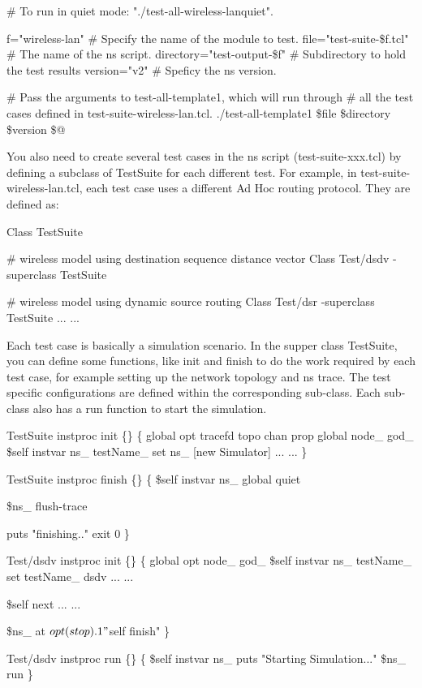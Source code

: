 \begin{program}
   \# To run in quiet mode:  "./test-all-wireless-lanquiet".

   f="wireless-lan"		\# Specify the name of the module to test.
   file="test-suite-\$f.tcl"	\# The name of the ns script.
   directory="test-output-\$f" 	\# Subdirectory to hold the test results
   version="v2"			\# Speficy the ns version.
   
   \# Pass the arguments to test-all-template1, which will run through
   \# all the test cases defined in test-suite-wireless-lan.tcl.
   ./test-all-template1 \$file \$directory \$version \$@
\end{program}


You also need to create several test cases in the ns script (test-suite-xxx.tcl)
by defining a subclass of TestSuite for each different test. For example, in 
test-suite-wireless-lan.tcl, each test case uses a different Ad Hoc routing 
protocol. They are defined as:

\begin{program}	
   Class TestSuite

   \# wireless model using destination sequence distance vector
   Class Test/dsdv -superclass TestSuite

   \# wireless model using dynamic source routing
   Class Test/dsr -superclass TestSuite
   ... ...

\end{program}


Each test case is basically a simulation scenario. In the supper class 
TestSuite, you can define some functions, like init and finish to do the work 
required by each test case, for example setting up the network topology and ns
trace. The test specific configurations are defined within the corresponding 
sub-class. Each sub-class also has a run function to start the simulation.

\begin{program}	
   TestSuite instproc init \{\} \{
     global opt tracefd topo chan prop 
     global node_ god_ 
     \$self instvar ns_ testName_
     set ns_         [new Simulator]
      ... ...
   \} 

   TestSuite instproc finish \{\} \{
     \$self instvar ns_
     global quiet

     \$ns_ flush-trace

     puts "finishing.."
     exit 0
   \}
        
   Test/dsdv instproc init \{\} \{
     global opt node_ god_
     \$self instvar ns_ testName_
     set testName_       dsdv
     ... ...    

     \$self next
     ... ...

     \$ns_ at $opt(stop).1 "$self finish"
   \}

   Test/dsdv instproc run \{\} \{
     \$self instvar ns_
     puts "Starting Simulation..."
     \$ns_ run
   \}
\end{program}

